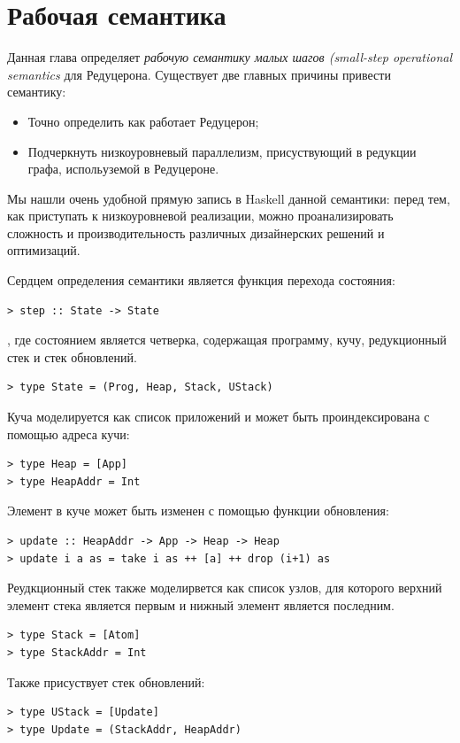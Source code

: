 \documentclass[flenqn, 14pt]{extarticle}
\begin{document}
\section{Рабочая семантика}
Данная глава определяет \textit{рабочую семантику малых шагов (small-step operational semantics} для Редуцерона. Существует две главных причины привести семантику:
\begin{itemize}
\item Точно определить как работает Редуцерон;
\item Подчеркнуть низкоуровневый параллелизм, присуствующий в редукции графа, испольуземой в Редуцероне.
\end{itemize}
Мы нашли очень удобной прямую запись в Haskell данной семантики: перед тем, как приступать к низкоуровневой реализации, можно проанализировать сложность и производительность различных дизайнерских решений и оптимизаций.

Сердцем определения семантики является функция перехода состояния:
\begin{verbatim}
> step :: State -> State
\end{verbatim}

, где состоянием является четверка, содержащая программу, кучу, редукционный стек и стек обновлений.
\begin{verbatim}
> type State = (Prog, Heap, Stack, UStack)
\end{verbatim}

Куча моделируется как список приложений и может быть проиндексирована с помощью адреса кучи:
\begin{verbatim}
> type Heap = [App]
> type HeapAddr = Int
\end{verbatim}

Элемент в куче может быть изменен с помощью функции обновления:
\begin{verbatim}
> update :: HeapAddr -> App -> Heap -> Heap
> update i a as = take i as ++ [a] ++ drop (i+1) as
\end{verbatim}

Реудкционный стек также моделирвется как список узлов, для которого верхний элемент стека является первым и нижный элемент является последним.
\begin{verbatim}
> type Stack = [Atom]
> type StackAddr = Int
\end{verbatim}

Также присуствует стек обновлений:
\begin{verbatim}
> type UStack = [Update]
> type Update = (StackAddr, HeapAddr)
\end{verbatim}
\end{document}
